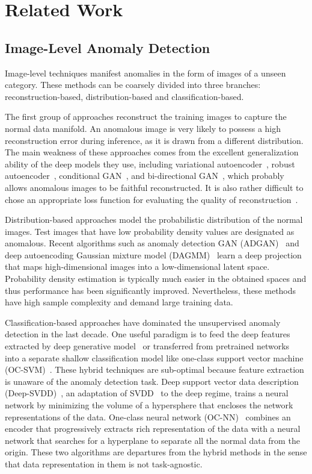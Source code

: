 \documentclass[final]{cvpr}
\begin{document}
{\section{Related Work}
\label{sec2}



\subsection{Image-Level Anomaly Detection}
\label{sec2-sub1}

Image-level techniques manifest anomalies in the form of images of a unseen category. These methods can be coarsely divided into three branches: reconstruction-based, distribution-based and classification-based.

The first group of approaches reconstruct the training images to capture the normal data manifold. An anomalous image is very likely to possess a high reconstruction error during inference, as it is drawn from a different distribution. The main weakness of these approaches comes from the excellent generalization ability of the deep models they use, including variational autoencoder~\cite{An2015}, robust autoencoder~\cite{Zhou2017}, conditional GAN~\cite{Akcay2018}, and bi-directional GAN~\cite{Zenati2018},  which probably allows anomalous images to be faithful reconstructed. It is also rather difficult to chose an appropriate loss function for evaluating the quality of reconstruction~\cite{Bergmann2019b}.

Distribution-based approaches model the probabilistic distribution of the normal images. Test images that have low probability density values are designated as anomalous. Recent algorithms such as anomaly detection GAN (ADGAN)~\cite{Deecke2018} and deep autoencoding Gaussian mixture model (DAGMM)~\cite{Zong2018} learn a deep projection that maps high-dimensional images into a low-dimensional latent space. Probability density estimation is typically much easier in the obtained spaces and thus performance has been significantly improved. Nevertheless, these methods have high sample complexity and demand large training data.

Classification-based approaches have dominated the unsupervised anomaly detection in the last decade. One useful paradigm is to feed the deep features extracted by deep generative model~\cite{Burlina2019} or transferred from pretrained networks~\cite{Andrews2016,Erfani2016} into a separate shallow classification model like one-class support vector machine (OC-SVM)~\cite{Scholkopf2001}. These hybrid techniques are sub-optimal because feature extraction is unaware of the anomaly detection task. Deep support vector
data description (Deep-SVDD)~\cite{Ruff2018}, an adaptation of SVDD~\cite{Tax2004} to the
deep regime, trains a neural network by minimizing the volume of a hypersphere that encloses the network representations of the data. One-class neural network (OC-NN)~\cite{Chalapathy2018} combines an encoder that progressively extracts rich representation of the data with a neural network that searches for a hyperplane to separate all the normal data from the origin. These two algorithms are departures from the hybrid methods in the sense that data representation in them is not task-agnostic.

}
\end{document}
